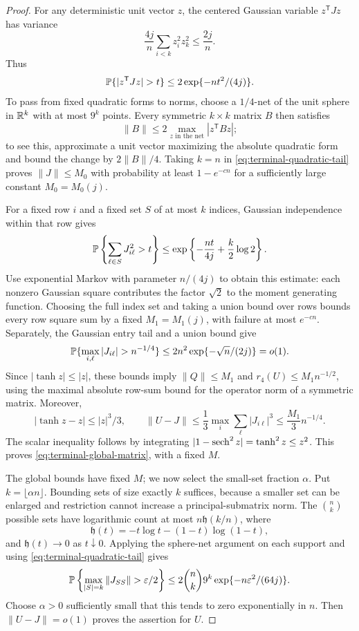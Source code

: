 \begin{proof}
For any deterministic unit vector $z$, the centered Gaussian variable
$z^{\mathsf T}Jz$ has variance
\[
 \frac{4j}{n}\sum_{i<k}z_i^2z_k^2\le\frac{2j}{n}.
\]
Thus
\begin{equation}
 \Prob\{|z^{\mathsf T}Jz|>t\}\le
                 2\exp\{-nt^2/(4j)\}.
 \label{eq:terminal-quadratic-tail}
\end{equation}
To pass from fixed quadratic forms to norms, choose a $1/4$-net of the
unit sphere in $\mathbb R^k$ with at most $9^k$ points. Every symmetric
$k\times k$ matrix $B$ then satisfies
\[
 \|B\|\le2\max_{z\text{ in the net}}|z^{\mathsf T}Bz|;
\]
to see this, approximate a unit vector maximizing the absolute quadratic
form and bound the change by $2\|B\|/4$.  Taking $k=n$ in
\eqref{eq:terminal-quadratic-tail} proves $\|J\|\le M_0$ with probability
at least $1-e^{-c n}$ for a sufficiently large constant $M_0=M_0(j)$.

For a fixed row $i$ and a fixed set $S$ of at most $k$ indices, Gaussian
independence within that row gives
\begin{equation}
 \mathbb P\left\{\sum_{\ell\in S}J_{i\ell}^2>t\right\}
 \le \exp\left\{-\frac{nt}{4j}+\frac{k}{2}\log2\right\}.
 \label{eq:terminal-row-tail}
\end{equation}
Use exponential Markov with parameter $n/(4j)$ to obtain this estimate:
each nonzero Gaussian square contributes the factor $\sqrt2$ to the
moment generating function. Choosing the full index set and taking a
union bound over rows bounds every row square sum by a fixed
$M_1=M_1(j)$, with failure at most $e^{-cn}$. Separately, the Gaussian
entry tail and a union bound give
\[
 \Prob\{\max_{i,\ell}|J_{i\ell}|>n^{-1/4}\}
 \le 2n^2\exp\{-\sqrt n/(2j)\}=o(1).
\]
Since $|\tanh z|\le|z|$, these bounds imply $\|Q\|\le M_1$ and
$r_4(U)\le M_1n^{-1/2}$, using the maximal absolute row-sum bound for
the operator norm of a symmetric matrix.  Moreover,
\[
 |\tanh z-z|\le |z|^3/3,
 \qquad
 \|U-J\|\le \frac13\max_i\sum_\ell|J_{i\ell}|^3
                \le\frac{M_1}{3}n^{-1/4}.
\]
The scalar inequality follows by integrating
$|1-\operatorname{sech}^2 z|=\tanh^2 z\le z^2$.  This proves
\eqref{eq:terminal-global-matrix}, with a fixed $M$.

The global bounds have fixed $M$; we now select the small-set fraction
$\alpha$. Put $k=\lfloor\alpha n\rfloor$. Bounding sets of size exactly
$k$ suffices, because a smaller set can be enlarged and restriction cannot
increase a principal-submatrix norm. The $\binom nk$ possible sets have
logarithmic count at most $n\mathfrak h(k/n)$, where
\[
 \mathfrak h(t)=-t\log t-(1-t)\log(1-t),
\]
and $\mathfrak h(t)\to0$ as $t\downarrow0$.  Applying the sphere-net
argument on each support and using \eqref{eq:terminal-quadratic-tail}
gives
\[
 \Prob\left\{\max_{|S|=k}\|J_{SS}\|>\varepsilon/2\right\}
 \le 2\binom nk9^k
                  \exp\{-n\varepsilon^2/(64j)\}.
\]
Choose $\alpha>0$ sufficiently small that this tends to zero
exponentially in $n$.  Then $\|U-J\|=o(1)$ proves the assertion for $U$.


\end{proof}
